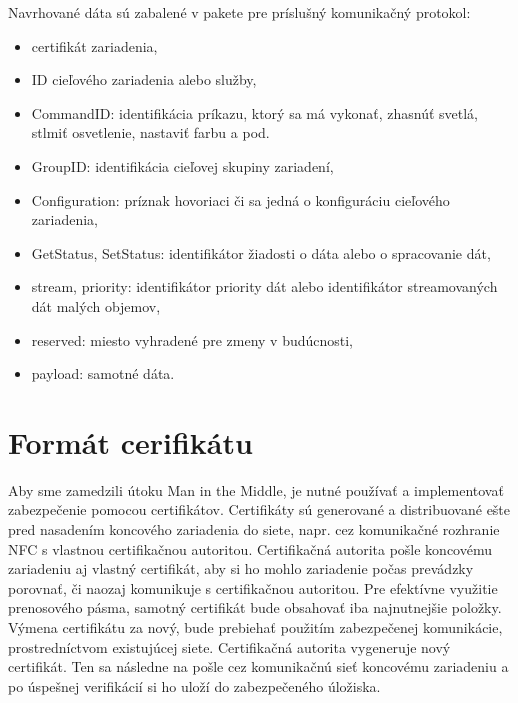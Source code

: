 \documentclass[12pt,a4paper,oneside,openright]{report}
\begin{document}
Navrhované dáta sú zabalené v pakete pre príslušný komunikačný protokol:
\singlespacing
\begin{itemize}
	\item certifikát zariadenia,
	\item ID cieľového zariadenia alebo služby,
	\item CommandID: identifikácia príkazu, ktorý sa má vykonať, zhasnúť svetlá, stlmiť osvetlenie, nastaviť farbu a pod.
	\item GroupID: identifikácia cieľovej skupiny zariadení,
	\item Configuration: príznak hovoriaci či sa jedná o konfiguráciu cieľového zariadenia,
	\item GetStatus, SetStatus: identifikátor žiadosti o dáta alebo o spracovanie dát,
	\item stream, priority: identifikátor priority dát alebo identifikátor streamovaných dát malých objemov,
	\item reserved: miesto vyhradené pre zmeny v budúcnosti,
	\item payload: samotné dáta.
\end{itemize}
\onehalfspacing


\section{Formát cerifikátu}
Aby sme zamedzili útoku Man in the Middle, je nutné používať a implementovať zabezpečenie pomocou  certifikátov. Certifikáty sú generované a distribuované ešte pred nasadením koncového zariadenia do siete, napr. cez komunikačné rozhranie NFC s vlastnou certifikačnou autoritou. Certifikačná autorita pošle koncovému zariadeniu aj vlastný certifikát, aby si ho mohlo zariadenie počas prevádzky porovnať, či naozaj komunikuje s certifikačnou autoritou.
 Pre efektívne využitie prenosového pásma, samotný certifikát bude obsahovať iba najnutnejšie položky. Výmena certifikátu za nový, bude prebiehať použitím zabezpečenej komunikácie, prostredníctvom existujúcej siete. Certifikačná autorita vygeneruje nový certifikát. Ten sa následne na pošle cez komunikačnú sieť koncovému zariadeniu a po úspešnej verifikácií si ho uloží do zabezpečeného úložiska.
\end{document}
